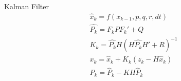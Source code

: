 \begin{frame}{Kalman Filter}
\begin{equation}
\begin{array}{c}
    \hat{x}_k = f(x_{k-1},p,q,r,dt) \\
    \hat{P_k} = F_k P F_k' + Q \\
    K_k = \hat{P_k} H \left(H \hat{P_k} H' + R\right)^{-1} \\
    x_k = \hat{x}_k + K_k \left(z_k - H \hat{x}_k \right) \\
    P_k = \hat{P}_k - K H \hat{P}_k 
\end{array}
\end{equation}
\end{frame}